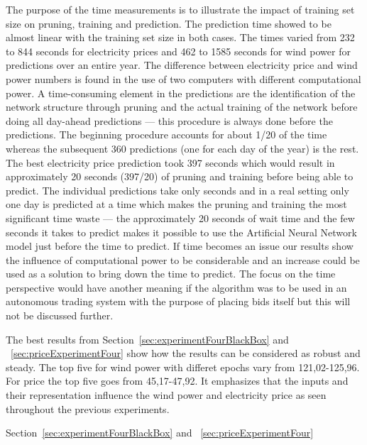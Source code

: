 The purpose of the time measurements is to illustrate the impact of training set size on pruning, training and prediction. The prediction time showed to be almost linear with the training set size in both cases. The times varied from 232 to 844 seconds for electricity prices and 462 to 1585 seconds for wind power for predictions over an entire year. The difference between electricity price and wind power numbers is found in the use of two computers with different computational power. A time-consuming element in the predictions are the identification of the network structure through pruning and the actual training of the network before doing all day-ahead predictions --- this procedure is always done before the predictions. The beginning procedure accounts for about 1/20 of the time whereas the subsequent 360 predictions (one for each day of the year) is the rest. The best electricity price prediction took 397 seconds which would result in approximately 20 seconds (397/20) of pruning and training before being able to predict. The individual predictions take only seconds and in a real setting only one day is predicted at a time which makes the pruning and training the most significant time waste --- the approximately 20 seconds of wait time and the few seconds it takes to predict makes it possible to use the Artificial Neural Network model just before the time to predict. If time becomes an issue our results show the influence of computational power to be considerable and an increase could be used as a solution to bring down the time to predict. The focus on the time perspective would have another meaning if the algorithm was to be used in an autonomous trading system with the purpose of placing bids itself but this will not be discussed further.  

The best results from Section~\ref{sec:experimentFourBlackBox} and ~\ref{sec:priceExperimentFour} show how the results can be considered as robust and steady. The top five for wind power with differet epochs vary from 121,02-125,96. For price the top five goes from 45,17-47,92. It emphasizes that the inputs and their representation influence the wind power and electricity price as seen throughout the previous experiments.

Section~\ref{sec:experimentFourBlackBox} and ~\ref{sec:priceExperimentFour}